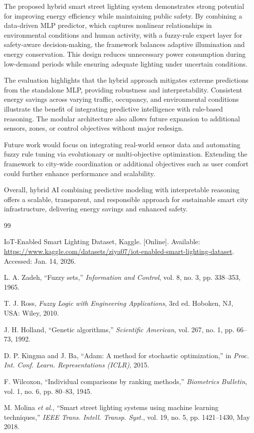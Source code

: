 \documentclass[conference]{IEEEtran}
\begin{document}
The proposed hybrid smart street lighting system demonstrates strong potential for improving energy efficiency while maintaining public safety. By combining a data-driven MLP predictor, which captures nonlinear relationships in environmental conditions and human activity, with a fuzzy-rule expert layer for safety-aware decision-making, the framework balances adaptive illumination and energy conservation. This design reduces unnecessary power consumption during low-demand periods while ensuring adequate lighting under uncertain conditions.

The evaluation highlights that the hybrid approach mitigates extreme predictions from the standalone MLP, providing robustness and interpretability. Consistent energy savings across varying traffic, occupancy, and environmental conditions illustrate the benefit of integrating predictive intelligence with rule-based reasoning. The modular architecture also allows future expansion to additional sensors, zones, or control objectives without major redesign.

Future work would focus on integrating real-world sensor data and automating fuzzy rule tuning via evolutionary or multi-objective optimization. Extending the framework to city-wide coordination or additional objectives such as user comfort could further enhance performance and scalability.

Overall, hybrid AI combining predictive modeling with interpretable reasoning offers a scalable, transparent, and responsible approach for sustainable smart city infrastructure, delivering energy savings and enhanced safety.


\begin{thebibliography}{99}

IoT-Enabled Smart Lighting Dataset, Kaggle. [Online]. Available: \url{https://www.kaggle.com/datasets/ziya07/iot-enabled-smart-lighting-dataset}. Accessed: Jan. 14, 2026.

L. A. Zadeh, ``Fuzzy sets,'' \emph{Information and Control}, vol. 8, no. 3, pp. 338--353, 1965.

T. J. Ross, \emph{Fuzzy Logic with Engineering Applications}, 3rd ed. Hoboken, NJ, USA: Wiley, 2010.

J. H. Holland, ``Genetic algorithms,'' \emph{Scientific American}, vol. 267, no. 1, pp. 66--73, 1992.

D. P. Kingma and J. Ba, ``Adam: A method for stochastic optimization,'' in \emph{Proc. Int. Conf. Learn. Representations (ICLR)}, 2015.

F. Wilcoxon, ``Individual comparisons by ranking methods,'' \emph{Biometrics Bulletin}, vol. 1, no. 6, pp. 80--83, 1945.

M. Molina \emph{et al.}, ``Smart street lighting systems using machine learning techniques,'' \emph{IEEE Trans. Intell. Transp. Syst.}, vol. 19, no. 5, pp. 1421--1430, May 2018.

\end{thebibliography}
\end{document}

